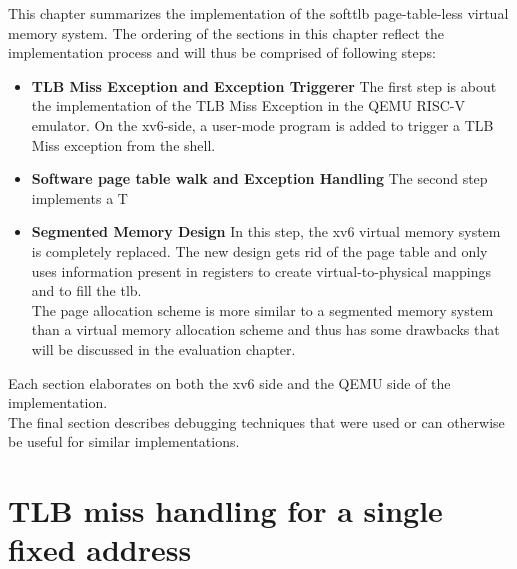This chapter summarizes the implementation of the softtlb page-table-less virtual memory system.
The ordering of the sections in this chapter reflect the implementation process and will thus
be comprised of following steps:
\begin{itemize}
    \item \textbf{TLB Miss Exception and Exception Triggerer} The first step is about
          the implementation of the TLB Miss Exception in the QEMU RISC-V emulator. On the xv6-side,
          a user-mode program is added to trigger a TLB Miss exception from the shell.
    \item \textbf{Software page table walk and Exception Handling} The second step implements a  T
    \item \textbf{Segmented Memory Design} In this step, the xv6 virtual memory system is completely
          replaced. The new design gets rid of the page table and only uses information present in
          registers to create virtual-to-physical mappings and to fill the tlb.\\The page allocation
          scheme is more similar to a segmented memory system than a virtual memory allocation scheme
          and thus has some drawbacks that will be discussed in the evaluation chapter.
\end{itemize}
Each section elaborates on both the xv6 side and the QEMU side of the implementation.\\
The final section describes debugging techniques that were used or can otherwise be useful for
similar implementations.



\section{TLB miss handling for a single fixed address}

